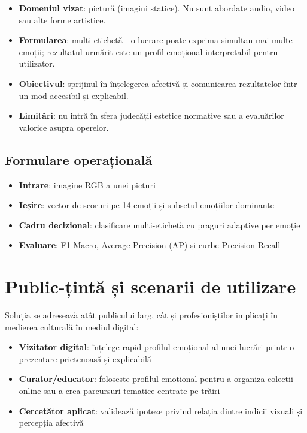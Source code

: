 \begin{itemize}
  \item \textbf{Domeniul vizat}: pictură (imagini statice). Nu sunt abordate audio, video sau alte forme artistice.
  \item \textbf{Formularea}: multi-etichetă - o lucrare poate exprima simultan mai multe emoții; rezultatul urmărit este un profil emoțional interpretabil pentru utilizator.
  \item \textbf{Obiectivul}: sprijinul în înțelegerea afectivă și comunicarea rezultatelor într-un mod accesibil și explicabil.
  \item \textbf{Limitări}: nu intră în sfera judecății estetice normative sau a evaluărilor valorice asupra operelor.
\end{itemize}

\subsection{Formulare operațională}

\begin{itemize}
  \item \textbf{Intrare}: imagine RGB a unei picturi
  \item \textbf{Ieșire}: vector de scoruri pe 14 emoții și subsetul emoțiilor dominante
  \item \textbf{Cadru decizional}: clasificare multi-etichetă cu praguri adaptive per emoție
  \item \textbf{Evaluare}: F1-Macro, Average Precision (AP) și curbe Precision-Recall
\end{itemize}

\section{Public-țintă și scenarii de utilizare}
\label{sec:intro-public}

Soluția se adresează atât publicului larg, cât și profesioniștilor implicați în medierea culturală în mediul digital:

\begin{itemize}
  \item \textbf{Vizitator digital}: înțelege rapid profilul emoțional al unei lucrări printr-o prezentare prietenoasă și explicabilă
  \item \textbf{Curator/educator}: folosește profilul emoțional pentru a organiza colecții online sau a crea parcursuri tematice centrate pe trăiri
  \item \textbf{Cercetător aplicat}: validează ipoteze privind relația dintre indicii vizuali și percepția afectivă
\end{itemize}

